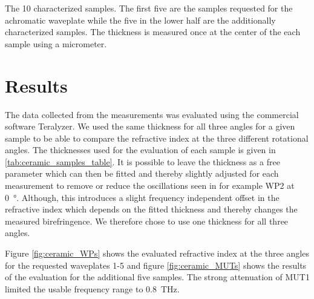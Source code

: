 
\begin{table}[h]
    \centering
    
    \caption{The 10 characterized samples. The first five are the samples requested for the achromatic waveplate while the five in the lower half are the additionally characterized samples. The thickness is measured once at the center of the each sample using a micrometer.}
    \label{tab:ceramic_samples_table}
\end{table}

\newpage

\section{Results}
The data collected from the measurements was evaluated using the commercial software Teralyzer. We used the same thickness for all three angles for a given sample to be able to compare the refractive index at the three different rotational angles. The thicknesses used for the evaluation of each sample is given in \ref{tab:ceramic_samples_table}. 
It is possible to leave the thickness as a free parameter which can then be fitted and thereby slightly adjusted for each measurement to remove or reduce the oscillations seen in for example WP2 at \SI{0}{\degree}. Although, this introduces a slight frequency independent offset in the refractive index which depends on the fitted thickness and thereby changes the measured birefringence. We therefore chose to use one thickness for all three angles. 

Figure \ref{fig:ceramic_WPs} shows the evaluated refractive index at the three angles for the requested waveplates 1-5 and figure \ref{fig:ceramic_MUTs} shows the results of the evaluation for the additional five samples. The strong attenuation of MUT1 limited the usable frequency range to \SI{0.8}{\tera \hertz}. 

